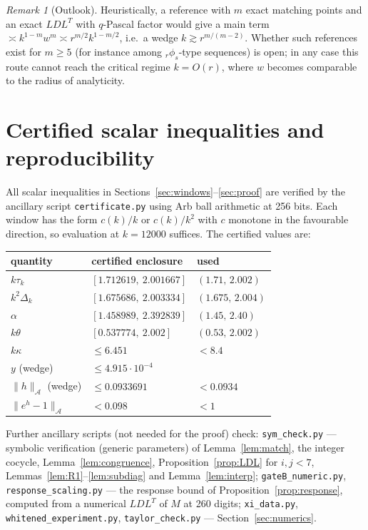 \documentclass[11pt,a4paper]{article}
\numberwithin{equation}{section}
\theoremstyle{definition}
\theoremstyle{remark}
\newtheorem{remark}[theorem]{Remark}
\newcommand{\cA}{\mathcal A}
\begin{document}
\begin{remark}[Outlook]
Heuristically, a reference with $m$ exact matching points and an exact $LDL^T$ with $q$-Pascal factor would give a main
term $\asymp k^{1-m}w^m\asymp r^{m/2}k^{1-m/2}$, i.e.\ a wedge $k\gtrsim r^{m/(m-2)}$. Whether such references exist for
$m\ge5$ (for instance among ${}_r\phi_s$-type sequences) is open; in any case this route cannot reach the critical regime
$k=O(r)$, where $w$ becomes comparable to the radius of analyticity.
\end{remark}

\appendix
\section{Certified scalar inequalities and reproducibility}\label{app:cert}

All scalar inequalities in Sections~\ref{sec:windows}--\ref{sec:proof} are verified by the ancillary script
\texttt{certificate.py} using Arb ball arithmetic \cite{Arb} at 256 bits. Each window has the form $c(k)/k$ or
$c(k)/k^2$ with $c$ monotone in the favourable direction, so evaluation at $k=12000$ suffices. The certified values are:

\begin{center}
\begin{tabular}{lll}
\toprule
quantity & certified enclosure & used\\
\midrule
$k\tau_k$ & $[1.712619,\ 2.001667]$ & $(1.71,\,2.002)$\\
$k^2\Delta_k$ & $[1.675686,\ 2.003334]$ & $(1.675,\,2.004)$\\
$\alpha$ & $[1.458989,\ 2.392839]$ & $(1.45,\,2.40)$\\
$k\theta$ & $[0.537774,\ 2.002]$ & $(0.53,\,2.002)$\\
$k\kappa$ & $\le 6.451$ & $<8.4$\\
$y$ (wedge) & $\le4.915\cdot10^{-4}$ & \\
$\|h\|_\cA$ (wedge) & $\le0.0933691$ & $<0.0934$\\
$\|e^h-1\|_\cA$ & $<0.098$ & $<1$\\
\bottomrule
\end{tabular}
\end{center}

\noindent Further ancillary scripts (not needed for the proof) check:
\texttt{sym\_check.py} --- symbolic verification (generic parameters) of Lemma~\ref{lem:match}, the integer cocycle,
Lemma~\ref{lem:congruence}, Proposition~\ref{prop:LDL} for $i,j<7$, Lemmas~\ref{lem:R1}--\ref{lem:subdiag} and
Lemma~\ref{lem:interp};
\texttt{gateB\_numeric.py}, \texttt{response\_scaling.py} --- the response bound of Proposition~\ref{prop:response},
computed from a numerical $LDL^T$ of $M$ at 260 digits;
\texttt{xi\_data.py}, \texttt{whitened\_experiment.py}, \texttt{taylor\_check.py} --- Section~\ref{sec:numerics}.
\end{document}
